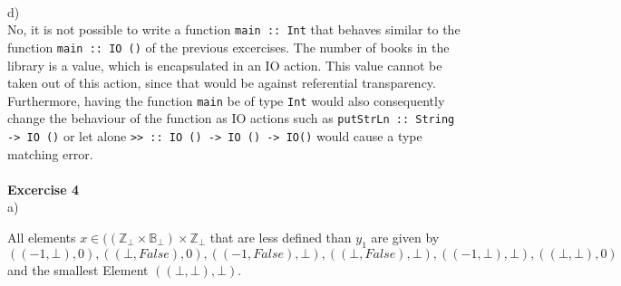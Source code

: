 \documentclass[a4paper,12pt,oneside]{book}
\begin{document}
~\\
d)\\
No, it is not possible to write a function \texttt{main :: Int} that behaves similar to the function \texttt{main :: IO ()} of the previous excercises. The number of books in the library is a value, which is encapsulated in an IO action. This value cannot be taken out of this action, since that would be against referential transparency. Furthermore, having the function \texttt{main} be of type \texttt{Int} would also consequently change the behaviour of the function as IO actions such as \texttt{putStrLn :: String -> IO ()} or let alone \texttt{>> :: IO () -> IO () -> IO()} would cause a type matching error.
~\\
~\\
\textbf{Excercise 4} \\%
a)
\begin{center}
\end{center}

All elements $x \in (( \mathbb{Z}_{\bot} \times \mathbb{B}_{\bot}) \times \mathbb{Z}_{\bot}$ that are less defined than $y_1$ are given by $((-1,\bot),0),((\bot,False),0),((-1,False),\bot),((\bot,False),\bot),((-1,\bot),\bot),((\bot,\bot),0)$ and the smallest Element $((\bot,\bot),\bot)$.
\\
\end{document}
